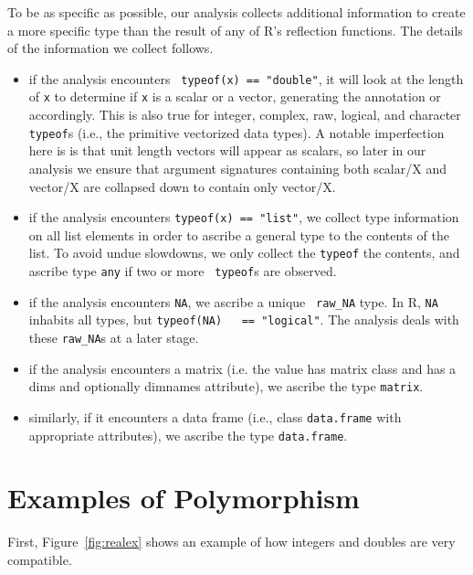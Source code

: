 \documentclass[acmsmall,10pt,review,anonymous]{acmart}\settopmatter{printfolios=true,printccs=false,printacmref=false}
\newcommand{\code}[1]{\lstinline|#1|\xspace}
\begin{document}
To be as specific as possible, our analysis collects additional information
to create a more specific type than the result of any of R's reflection
functions.  The details of the information we collect follows.

\begin{itemize}
\item if the analysis encounters \code{ typeof(x) == "double"}, it will look
  at the length of {\tt x} to determine if {\tt x} is a scalar or a vector,
  generating the annotation {\tt \sD} or {\tt \D} accordingly.  This is
  also true for integer, complex, raw, logical, and character {\tt typeof}s
  (i.e., the primitive vectorized data types).  A notable imperfection here
  is is that unit length vectors will appear as scalars, so later in our
  analysis we ensure that argument signatures containing both scalar/X and
  vector/X are collapsed down to contain only vector/X.
	
\item if the analysis encounters \code{typeof(x) == "list"}, we collect type
  information on all list elements in order to ascribe a general type to the
  contents of the list.  To avoid undue slowdowns, we only collect the
  \code{typeof} the contents, and ascribe type {\tt any} if two or more {\tt
    typeof}s are observed.
	
\item if the analysis encounters \code{NA}, we ascribe a unique {\tt
  raw\_NA} type.  In R, \code{NA} inhabits all types, but \code{typeof(NA)
  == "logical"}.  The analysis deals with these {\tt raw\_NA}s at a later
  stage.
	
\item if the analysis encounters a matrix (i.e. the value has matrix class
  and has a dims and optionally dimnames attribute), we ascribe the type
  {\tt matrix}.
	
\item similarly, if it encounters a data frame (i.e., class {\tt data.frame}
  with appropriate attributes), we ascribe the type {\tt data.frame}.
\end{itemize}


%
%
%
\section{Examples of Polymorphism}
\label{sec:polyex}


First, Figure~\ref{fig:realex} shows an example of how integers and doubles
are very compatible.  
\end{document}

